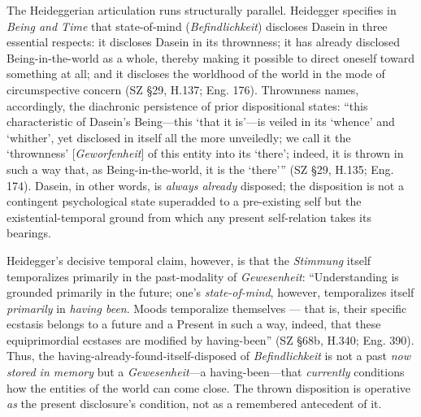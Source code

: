 \documentclass{article}
\begin{document}
The Heideggerian articulation runs structurally parallel. Heidegger specifies in \textit{Being and Time} that state-of-mind (\textit{Befindlichkeit}) discloses Dasein in three essential respects: it discloses Dasein in its thrownness; it has already disclosed Being-in-the-world as a whole, thereby making it possible to direct oneself toward something at all; and it discloses the worldhood of the world in the mode of circumspective concern (SZ \S29, H.137; Eng. 176). Thrownness names, accordingly, the diachronic persistence of prior dispositional states: ``this characteristic of Dasein's Being---this `that it is'---is veiled in its `whence' and `whither', yet disclosed in itself all the more unveiledly; we call it the `thrownness' [\textit{Geworfenheit}] of this entity into its `there'; indeed, it is thrown in such a way that, as Being-in-the-world, it is the `there''' (SZ \S29, H.135; Eng. 174). Dasein, in other words, is \textit{always already} disposed; the disposition is not a contingent psychological state superadded to a pre-existing self but the existential-temporal ground from which any present self-relation takes its bearings.

Heidegger's decisive temporal claim, however, is that the \textit{Stimmung} itself temporalizes primarily in the past-modality of \textit{Gewesenheit}: ``Understanding is grounded primarily in the future; one's \textit{state-of-mind}, however, temporalizes itself \textit{primarily} in \textit{having been}. Moods temporalize themselves --- that is, their specific ecstasis belongs to a future and a Present in such a way, indeed, that these equiprimordial ecstases are modified by having-been'' (SZ \S68b, H.340; Eng. 390). Thus, the having-already-found-itself-disposed of \textit{Befindlichkeit} is not a past \textit{now stored in memory} but a \textit{Gewesenheit}---a having-been---that \textit{currently} conditions how the entities of the world can come close. The thrown disposition is operative \textit{as} the present disclosure's condition, not as a remembered antecedent of it.
\end{document}
